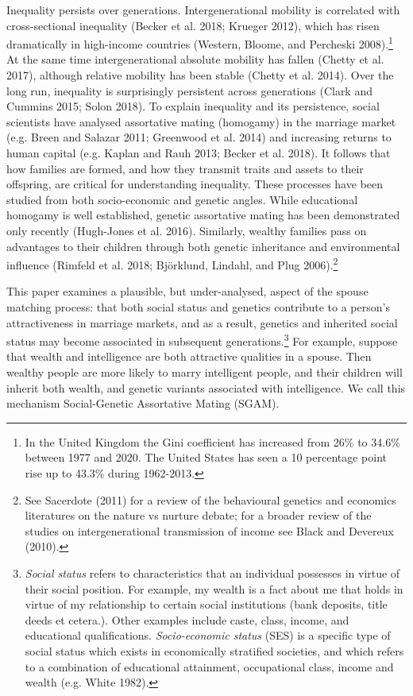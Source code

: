 \documentclass[
]{article}
\begin{document}
Inequality persists over generations.
Intergenerational mobility is correlated with cross-sectional inequality
(Becker et al. 2018; Krueger 2012), which has risen dramatically in
high-income countries (Western, Bloome, and Percheski 2008).\footnote{In the United Kingdom the Gini coefficient has increased from 26\% to 34.6\% between 1977 and 2020. The United States has seen a 10 percentage point rise up to 43.3\% during 1962-2013.} At the same time
intergenerational absolute mobility has fallen (Chetty et al. 2017), although
relative mobility has been stable (Chetty et al. 2014). Over the long run,
inequality is surprisingly persistent across generations
(Clark and Cummins 2015; Solon 2018). To explain inequality and its
persistence, social scientists have analysed assortative mating (homogamy) in
the marriage market (e.g. Breen and Salazar 2011; Greenwood et al. 2014) and
increasing returns to human capital (e.g. Kaplan and Rauh 2013; Becker et al. 2018). It
follows that how families are formed, and how they transmit traits and assets to
their offspring, are critical for understanding inequality. These processes
have been studied from both socio-economic and genetic angles. While educational
homogamy is well established, genetic assortative mating has been demonstrated
only recently (Hugh-Jones et al. 2016). Similarly, wealthy families pass on
advantages to their children through both genetic inheritance and environmental
influence (Rimfeld et al. 2018; Björklund, Lindahl, and Plug 2006).\footnote{See Sacerdote (2011) for a review of the behavioural genetics and
  economics literatures on the nature vs nurture debate; for a broader review of
  the studies on intergenerational transmission of income see Black and Devereux (2010).}

This paper examines a plausible, but under-analysed, aspect of the spouse
matching process: that both social status and genetics contribute to a person's
attractiveness in marriage markets, and as a result, genetics and inherited
social status may become associated in subsequent generations.\footnote{\emph{Social status} refers to characteristics that an individual
  possesses in virtue of their social position. For example, my wealth
  is a fact about me that holds in virtue of my relationship to
  certain social institutions (bank deposits, title deeds et cetera.).
  Other examples include caste, class, income, and educational
  qualifications. \emph{Socio-economic status} (SES) is a specific type of
  social status which exists in economically stratified societies, and
  which refers to a combination of educational attainment,
  occupational class, income and wealth (e.g. White 1982).} For
example, suppose that wealth and intelligence are both attractive qualities in a
spouse. Then wealthy people are more likely to marry intelligent people, and
their children will inherit both wealth, and genetic variants associated with
intelligence. We call this mechanism Social-Genetic Assortative Mating (SGAM).
\end{document}
